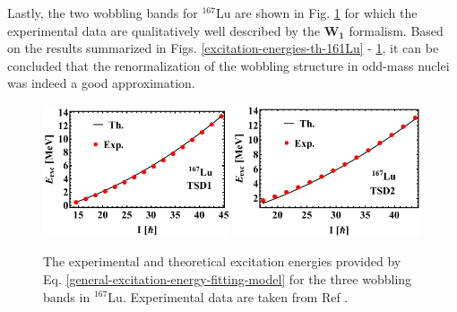 Lastly, the two wobbling bands for $^{167}$Lu are shown in Fig. \ref{excitation-energies-th-167Lu} for which the experimental data are qualitatively well described by the $\mathbf{W_1}$ formalism. Based on the results summarized in Figs. \ref{excitation-energies-th-161Lu} - \ref{excitation-energies-th-167Lu}, it can be concluded that the renormalization of the wobbling structure in odd-mass nuclei was indeed a good approximation.
\begin{figure}
    \centering
    \includegraphics[width=0.49\textwidth]{Chapters/Figures/Lu-exp-energies/fig5a_lu167.pdf}
    \includegraphics[width=0.49\textwidth]{Chapters/Figures/Lu-exp-energies/fig5b_lu167.pdf}
    \caption{The experimental and theoretical excitation energies provided by Eq. \ref{general-excitation-energy-fitting-model} for the three wobbling bands in $^{167}$Lu. Experimental data are taken from Ref \cite{amro2003wobbling}.}
    \label{excitation-energies-th-167Lu}
\end{figure}

